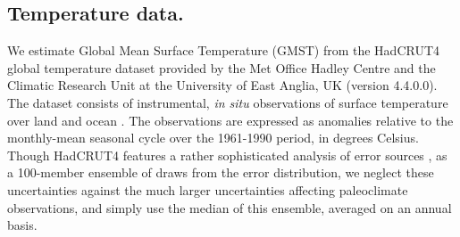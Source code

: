 \documentclass[12pt]{amsart}
\theoremstyle{plain}
\theoremstyle{definition}
\theoremstyle{remark}
\newcommand{\lb}[1]{\color{MidnightBlue}\textbf{[LB: #1]}\normalcolor}
\newcommand{\jeg}[1]{\color{ProcessBlue}\textbf{[JEG: #1]}\normalcolor}
\begin{document}
\subsection{Temperature data.}
We estimate Global Mean Surface Temperature (GMST) from the HadCRUT4 global temperature dataset provided by the Met Office Hadley
Centre and the Climatic Research Unit at the University of East Anglia, UK
(version 4.4.0.0). The dataset consists of instrumental, {\it in situ}
observations of surface temperature over land \citep{Jones2012} and ocean
\citep{Kennedy2011, Kennedy2011a}. The
observations are expressed as anomalies relative to the monthly-mean seasonal cycle over the 1961-1990 period, in degrees Celsius. Though HadCRUT4 features a rather sophisticated analysis of error sources \citep{Morice2012}, as a 100-member ensemble of draws from the error distribution, we neglect these uncertainties against the much larger uncertainties affecting paleoclimate observations, and simply use the median of this ensemble, averaged on an annual basis.

\end{document}
